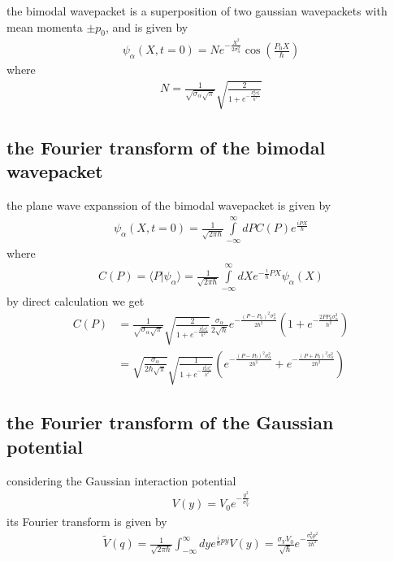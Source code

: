 the bimodal wavepacket is a superposition of two gaussian wavepackets with mean momenta $\pm p_0$, and is given by
\begin{align}
    \psi_\alpha(X,t=0) = N e^{-\frac{X^2}{2\sigma_\alpha^2}}\cos\left(\frac{P_0 X}{\hbar}\right)
\end{align}
where
\begin{align}
    N = \frac1{\sqrt{\sigma_\alpha\sqrt{\pi}}}\sqrt{\frac{2}{1+e^{-\frac{P_0^2\sigma_\alpha^2}{\hbar^2}}}}
\end{align}

\subsection{the Fourier transform of the bimodal wavepacket}

the plane wave expanssion of the bimodal wavepacket is given by
\begin{align}
    \psi_\alpha(X,t=0) = \frac1{\sqrt{2\pi\hbar}}\int\limits_{-\infty}^{\infty}dP C(P)e^{\frac{iPX}{\hbar}}
\end{align}
where
\begin{align}
    C(P) = \langle P|\psi_\alpha\rangle = \frac{1}{\sqrt{2\pi\hbar}}\int\limits_{-\infty}^{\infty}dX e^{-\frac{i}{\hbar}PX}\psi_\alpha(X)
\end{align}
by direct calculation we get
\begin{align}
    C(P) & = \frac1{\sqrt{\sigma_\alpha\sqrt{\pi}}}\sqrt{\frac{2}{1+e^{-\frac{P_0^2\sigma_\alpha^2}{\hbar^2}}}}\frac{\sigma_\alpha}{2\sqrt{\hbar}} e^{-\frac{(P-P_0)^2\sigma_\alpha^2}{2\hbar^2}}\left(1+e^{-\frac{2P P_0\sigma_\alpha^2}{\hbar^2}}\right)\nonumber \\
         & = \sqrt{\frac{\sigma_\alpha}{2\hbar\sqrt{\pi}}}\sqrt{\frac{1}{1+e^{-\frac{P_0^2\sigma_\alpha^2}{\hbar^2}}}} \left(e^{-\frac{(P-P_0)^2\sigma_\alpha^2}{2\hbar^2}}+e^{-\frac{(P+P_0)^2\sigma_\alpha^2}{2\hbar^2}}\right)
\end{align}
\subsection{the Fourier transform of the Gaussian potential}

considering the Gaussian interaction potential
\begin{align}
    V(y) = V_0 e^{-\frac{y^2}{\sigma_V^2}}
\end{align}
its Fourier transform is given by
\begin{align}
    \tilde V(q) = \frac{1}{\sqrt{2\pi\hbar}}\int_{-\infty}^\infty dy e^{\frac{i}{\hbar}py}V(y)=
    \frac{\sigma_V V_0}{\sqrt{\hbar}}e^{-\frac{\sigma_V^2 p^2}{2\hbar^2}}
\end{align}

